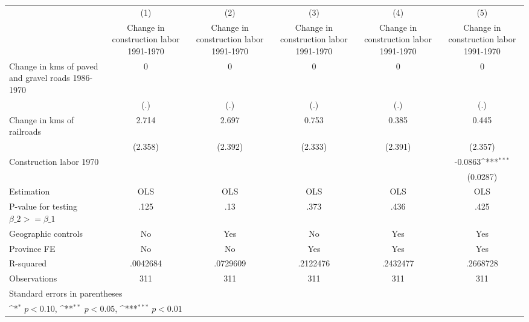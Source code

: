 {
\def\sym#1{\ifmmode^{#1}\else\(^{#1}\)\fi}
\begin{tabular}{l*{5}{c}}
\hline\hline
                    &\multicolumn{1}{c}{(1)}&\multicolumn{1}{c}{(2)}&\multicolumn{1}{c}{(3)}&\multicolumn{1}{c}{(4)}&\multicolumn{1}{c}{(5)}\\
                    &\multicolumn{1}{c}{Change in construction labor 1991-1970}&\multicolumn{1}{c}{Change in construction labor 1991-1970}&\multicolumn{1}{c}{Change in construction labor 1991-1970}&\multicolumn{1}{c}{Change in construction labor 1991-1970}&\multicolumn{1}{c}{Change in construction labor 1991-1970}\\
\hline
Change in kms of paved and gravel roads 1986-1970&           0         &           0         &           0         &           0         &           0         \\
                    &         (.)         &         (.)         &         (.)         &         (.)         &         (.)         \\
[1em]
Change in kms of railroads&       2.714         &       2.697         &       0.753         &       0.385         &       0.445         \\
                    &     (2.358)         &     (2.392)         &     (2.333)         &     (2.391)         &     (2.357)         \\
[1em]
Construction labor 1970&                     &                     &                     &                     &     -0.0863\sym{***}\\
                    &                     &                     &                     &                     &    (0.0287)         \\
\hline
Estimation          &         OLS         &         OLS         &         OLS         &         OLS         &         OLS         \\
P-value for testing $\beta\_2 >= \beta\_1$&        .125         &         .13         &        .373         &        .436         &        .425         \\
Geographic controls &          No         &         Yes         &          No         &         Yes         &         Yes         \\
Province FE         &          No         &          No         &         Yes         &         Yes         &         Yes         \\
R-squared           &    .0042684         &    .0729609         &    .2122476         &    .2432477         &    .2668728         \\
Observations        &         311         &         311         &         311         &         311         &         311         \\
\hline\hline
\multicolumn{6}{l}{\footnotesize Standard errors in parentheses}\\
\multicolumn{6}{l}{\footnotesize \sym{*} \(p<0.10\), \sym{**} \(p<0.05\), \sym{***} \(p<0.01\)}\\
\end{tabular}
}
